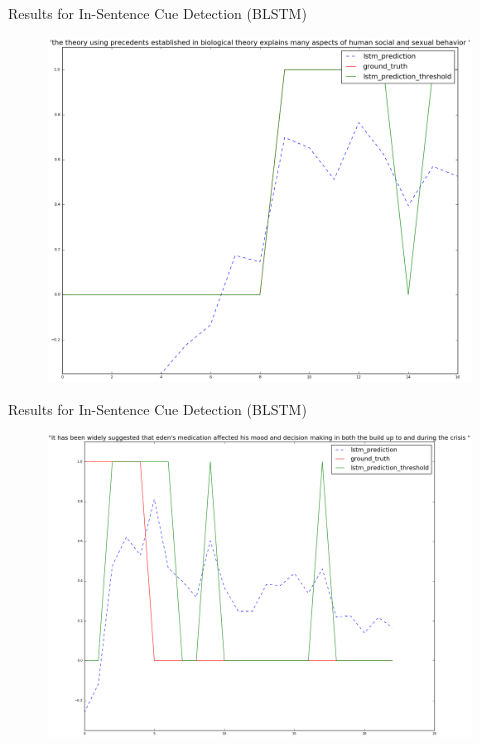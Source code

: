 \documentclass{beamer}
\begin{document}
\begin{frame}{Results for In-Sentence Cue Detection (BLSTM)}
	\begin{figure}[htbp]
		\includegraphics[scale=0.3]{images/task2_2dir/18_type1}
	\end{figure}
\end{frame}
\begin{frame}{Results for In-Sentence Cue Detection (BLSTM)}
	\begin{figure}[htbp]
		\includegraphics[scale=0.3]{images/task2_2dir/29_type1}
	\end{figure}
\end{frame}
\end{document}
